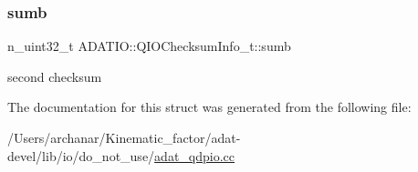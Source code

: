 \subsubsection{\texorpdfstring{sumb}{sumb}}
{\footnotesize\ttfamily n\+\_\+uint32\+\_\+t A\+D\+A\+T\+I\+O\+::\+Q\+I\+O\+Checksum\+Info\+\_\+t\+::sumb}

second checksum 

The documentation for this struct was generated from the following file\+:\begin{DoxyCompactItemize}
\item 
/\+Users/archanar/\+Kinematic\+\_\+factor/adat-\/devel/lib/io/do\+\_\+not\+\_\+use/\mbox{\hyperlink{adat-devel_2lib_2io_2do__not__use_2adat__qdpio_8cc}{adat\+\_\+qdpio.\+cc}}\end{DoxyCompactItemize}
